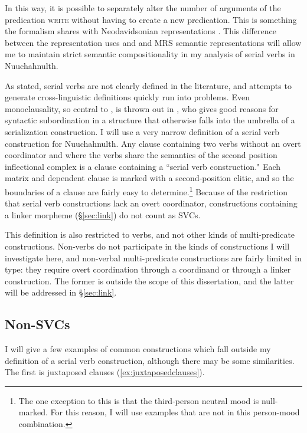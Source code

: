In this way, it is possible to separately alter the number of arguments of the predication \textsc{write} without having to create a new predication. This is something the formalism shares with Neodavidsonian representations \citep{parsons1990}. This difference between the representation \citeauthor{butt1995} uses and and MRS semantic representations will allow me to maintain strict semantic compositionality in my analysis of serial verbs in Nuuchahnulth.

As stated, serial verbs are not clearly defined in the literature, and attempts to generate cross-linguistic definitions quickly run into problems. Even monoclausality, so central to \cite{aikhenvalddixon2006}, is thrown out in \cite{butt1995}, who gives good reasons for syntactic subordination in a structure that otherwise falls into the umbrella of a serialization construction. I will use a very narrow definition of a serial verb construction for Nuuchahnulth. Any clause containing two verbs without an overt coordinator and where the verbs share the semantics of the second position inflectional complex is a clause containing a ``serial verb construction." Each matrix and dependent clause is marked with a second-position clitic, and so the boundaries of a clause are fairly easy to determine.\footnote{The one exception to this is that the third-person neutral mood is null-marked. For this reason, I will use examples that are not in this person-mood combination.} Because of the restriction that serial verb constructions lack an overt coordinator, constructions containing a linker morpheme (\S\ref{sec:link}) do not count as SVCs.

This definition is also restricted to verbs, and not other kinds of multi-predicate constructions. Non-verbs do not participate in the kinds of constructions I will investigate here, and non-verbal multi-predicate constructions are fairly limited in type: they require overt coordination through a coordinand or through a linker construction. The former is outside the scope of this dissertation, and the latter will be addressed in \S\ref{sec:link}.

\subsection{Non-SVCs}

I will give a few examples of common constructions which fall outside my definition of a serial verb construction, although there may be some similarities. The first is juxtaposed clauses (\ref{ex:juxtaposedclauses}).

